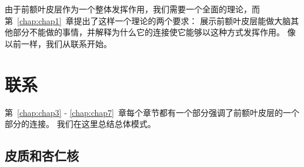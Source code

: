 由于前额叶皮层作为一个整体发挥作用，我们需要一个全面的理论，而第~\ref{chap:chap1}~章提出了这样一个理论的两个要求：
展示前额叶皮层能做大脑其他部分不能做的事情，并解释为什么它的连接使它能够以这种方式发挥作用。
像以前一样，我们从联系开始。



\section{联系}
\par
第~\ref{chap:chap3} - \ref{chap:chap7}~章每个章节都有一个部分强调了前额叶皮层的一个部分的连接。
我们在这里总结总体模式。



\subsection{皮质和杏仁核}

